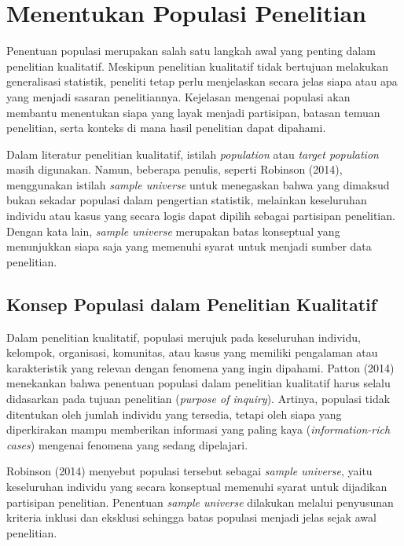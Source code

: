 \documentclass[
  indonesian,
  letterpaper,
  DIV=11,
  numbers=noendperiod]{scrreprt}
\begin{document}
\section{Menentukan Populasi
Penelitian}\label{menentukan-populasi-penelitian}

Penentuan populasi merupakan salah satu langkah awal yang penting dalam
penelitian kualitatif. Meskipun penelitian kualitatif tidak bertujuan
melakukan generalisasi statistik, peneliti tetap perlu menjelaskan
secara jelas siapa atau apa yang menjadi sasaran penelitiannya.
Kejelasan mengenai populasi akan membantu menentukan siapa yang layak
menjadi partisipan, batasan temuan penelitian, serta konteks di mana
hasil penelitian dapat dipahami.

Dalam literatur penelitian kualitatif, istilah \emph{population} atau
\emph{target population} masih digunakan. Namun, beberapa penulis,
seperti Robinson (2014), menggunakan istilah \emph{sample universe}
untuk menegaskan bahwa yang dimaksud bukan sekadar populasi dalam
pengertian statistik, melainkan keseluruhan individu atau kasus yang
secara logis dapat dipilih sebagai partisipan penelitian. Dengan kata
lain, \emph{sample universe} merupakan batas konseptual yang menunjukkan
siapa saja yang memenuhi syarat untuk menjadi sumber data penelitian.

\subsection{Konsep Populasi dalam Penelitian
Kualitatif}\label{konsep-populasi-dalam-penelitian-kualitatif}

Dalam penelitian kualitatif, populasi merujuk pada keseluruhan individu,
kelompok, organisasi, komunitas, atau kasus yang memiliki pengalaman
atau karakteristik yang relevan dengan fenomena yang ingin dipahami.
Patton (2014) menekankan bahwa penentuan populasi dalam penelitian
kualitatif harus selalu didasarkan pada tujuan penelitian (\emph{purpose
of inquiry}). Artinya, populasi tidak ditentukan oleh jumlah individu
yang tersedia, tetapi oleh siapa yang diperkirakan mampu memberikan
informasi yang paling kaya (\emph{information-rich cases}) mengenai
fenomena yang sedang dipelajari.

Robinson (2014) menyebut populasi tersebut sebagai \emph{sample
universe}, yaitu keseluruhan individu yang secara konseptual memenuhi
syarat untuk dijadikan partisipan penelitian. Penentuan \emph{sample
universe} dilakukan melalui penyusunan kriteria inklusi dan eksklusi
sehingga batas populasi menjadi jelas sejak awal penelitian.
\end{document}

